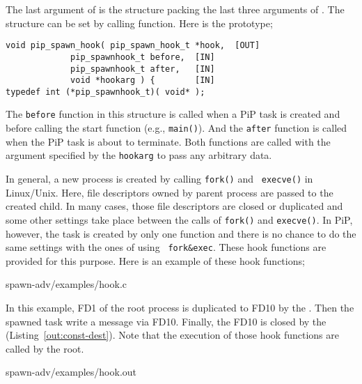 The last argument of  is the structure
packing the last three arguments of . The
 structure can be set by calling
 function. Here is the prototype;

\begin{lstlisting}[frame=tb]
void pip_spawn_hook( pip_spawn_hook_t *hook,  [OUT]
		     pip_spawnhook_t before,  [IN]
		     pip_spawnhook_t after,   [IN]
		     void *hookarg ) {        [IN]
typedef int (*pip_spawnhook_t)( void* );
\end{lstlisting}

The {\tt before} function in this structure is called when a
PiP task is created and before calling the start function (e.g.,
{\tt main()}). And the {\tt after} function is called when the PiP
task is about to terminate. Both functions are called with the argument
specified by the {\tt hookarg} to pass any arbitrary data. 

In general, a new process is created by calling {\tt fork()} and {\tt
execve()} in Linux/Unix. Here, file descriptors owned by
parent process are passed to the created child. In many cases, those
file descriptors are closed or duplicated and some other settings take
place between the calls of {\tt fork()} and {\tt execve()}. In PiP,
however, the task is created by only one function and there is no
chance to do the same settings with the ones of using {\tt
  fork\&exec}. These hook functions are provided for this purpose. Here 
is an example of these hook functions;  

 {spawn-adv/examples/hook.c}

In this example, FD1 of the root process is duplicated to FD10 by the
. Then the spawned task write a message via
FD10. Finally, the FD10 is closed by the 
(Listing~\ref{out:const-dest}). 
Note that the execution of those hook functions are called by the root. 


                {spawn-adv/examples/hook.out}
